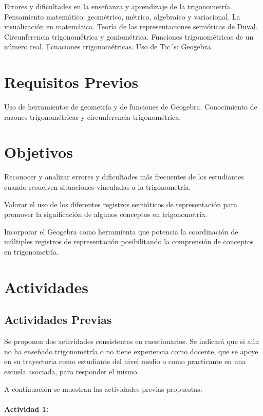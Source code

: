 \documentclass[oneside,spanish]{amsart}
\numberwithin{equation}{section}
\numberwithin{figure}{section}
\begin{document}
Errores y dificultades en la enseñanza y aprendizaje de la trigonometría. Pensamiento matemático: geométrico, métrico, algebraico y variacional. La visualización en matemática. Teoría de las representaciones semióticas de Duval. Circunferencia trigonométrica y goniométrica. Funciones trigonométricas de un número real. Ecuaciones trigonométricas. Uso de Tic´s: Geogebra.

\section{Requisitos Previos}

Uso de herramientas de geometría y de funciones de Geogebra. Conocimiento de razones trigonométricas y circunferencia trigonométrica.

\section{Objetivos}

Reconocer y analizar errores y dificultades más frecuentes de los estudiantes cuando resuelven  situaciones vinculadas a la trigonometría.

Valorar el uso de los diferentes registros semióticos de representación para promover la significación de algunos conceptos en trigonometría.

Incorporar el Geogebra como herramienta que potencia la coordinación de múltiples registros de representación posibilitando la comprensión de conceptos en trigonometría.

\section{Actividades}

\subsection{Actividades Previas}

Se proponen dos actividades consistentes en cuestionarios. Se indicará que si aún no ha enseñado trigonometría o no tiene experiencia como docente, que se apoye en su trayectoria como estudiante del nivel medio o como practicante en una escuela asociada, para responder el mismo.

A continuación se muestran las actividades previas propuestas:

\paragraph{Actividad 1:}
\end{document}
